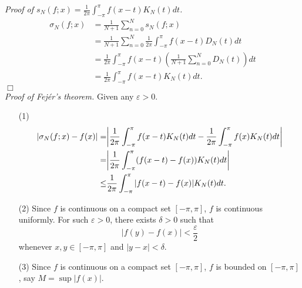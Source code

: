\documentclass{article}
\begin{document}
\emph{Proof of $s_N(f;x) = \frac{1}{2\pi} \int_{-\pi}^{\pi} f(x-t)K_N(t)dt$.}
  \begin{align*}
    \sigma_N(f;x)
    &= \frac{1}{N+1} \sum_{n=0}^{N} s_N(f;x) \\
    &= \frac{1}{N+1} \sum_{n=0}^{N} \frac{1}{2\pi} \int_{-\pi}^{\pi} f(x-t)D_N(t)dt \\
    &= \frac{1}{2\pi} \int_{-\pi}^{\pi} f(x-t)
      \left( \frac{1}{N+1} \sum_{n=0}^{N} D_N(t) \right) dt \\
    &= \frac{1}{2\pi} \int_{-\pi}^{\pi} f(x-t) K_N(t) dt.
  \end{align*}
$\Box$ \\

\emph{Proof of Fej\'er's theorem.}
Given any $\varepsilon > 0$.
\begin{enumerate}
\item[(1)]
  \begin{align*}
    \abs{ \sigma_N(f;x) - f(x) }
    =& \abs{ \frac{1}{2\pi} \int_{-\pi}^{\pi} f(x-t) K_N(t) dt
      - \frac{1}{2\pi} \int_{-\pi}^{\pi} f(x) K_N(t) dt } \\
    =& \abs{ \frac{1}{2\pi} \int_{-\pi}^{\pi} (f(x-t)-f(x)) K_N(t) dt } \\
    \leq& \frac{1}{2\pi} \int_{-\pi}^{\pi} |f(x-t)-f(x)| K_N(t) dt.
  \end{align*}

\item[(2)]
Since $f$ is continuous on a compact set $[-\pi,\pi]$, $f$ is continuous uniformly.
For such $\varepsilon > 0$, there exists $\delta > 0$
such that
\[
  |f(y) - f(x)| < \frac{\varepsilon}{2}
\]
whenever $x,y \in [-\pi,\pi]$ and $|y-x| < \delta$.

\item[(3)]
Since $f$ is continuous on a compact set $[-\pi,\pi]$, $f$ is bounded
on $[-\pi,\pi]$, say $M = \sup|f(x)|$.


\end{enumerate}
\end{document}
